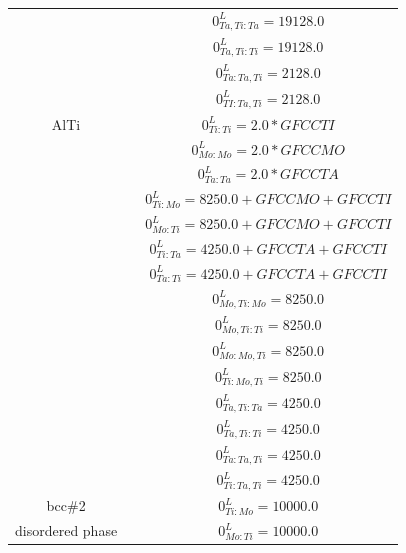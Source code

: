 \begin{longtable}[H]{ c c c }
                              & \cite{Ansara1998} & $0^\textit{L}_{Ta,Ti:Ta} = 19128.0$\\
                              & \cite{Ansara1998} & $0^\textit{L}_{Ta,Ti:Ti} = 19128.0$\\
                              & \cite{Ansara1998} & $0^\textit{L}_{Ta:Ta,Ti} = 2128.0$\\
                              & \cite{Ansara1998} & $0^\textit{L}_{TI:Ta,Ti} = 2128.0$\\
                       AlTi & \cite{Ansara1998} & $0^\textit{L}_{Ti:Ti} = 2.0*GFCCTI$\\
                              & \cite{Ansara1998} & $0^\textit{L}_{Mo:Mo} = 2.0*GFCCMO$\\
                              & \cite{Ansara1998} & $0^\textit{L}_{Ta:Ta} = 2.0*GFCCTA$\\
                              & \cite{Ansara1998} & $0^\textit{L}_{Ti:Mo} = 8250.0+GFCCMO+GFCCTI$\\
                              & \cite{Ansara1998} & $0^\textit{L}_{Mo:Ti} = 8250.0+GFCCMO+GFCCTI$\\
                              & \cite{Ansara1998} & $0^\textit{L}_{Ti:Ta} = 4250.0+GFCCTA+GFCCTI$\\
                              & \cite{Ansara1998} & $0^\textit{L}_{Ta:Ti} = 4250.0+GFCCTA+GFCCTI$\\
                              & \cite{Ansara1998} & $0^\textit{L}_{Mo,Ti:Mo} = 8250.0$\\
                              & \cite{Ansara1998} & $0^\textit{L}_{Mo,Ti:Ti} = 8250.0$\\
                        & \cite{Ansara1998} & $0^\textit{L}_{Mo:Mo,Ti} = 8250.0$\\
                        & \cite{Ansara1998} & $0^\textit{L}_{Ti:Mo,Ti} = 8250.0$\\
                        & \cite{Ansara1998} & $0^\textit{L}_{Ta,Ti:Ta} = 4250.0$\\
                        & \cite{Ansara1998} & $0^\textit{L}_{Ta,Ti:Ti} = 4250.0$\\
                        & \cite{Ansara1998} & $0^\textit{L}_{Ta:Ta,Ti} = 4250.0$\\
                        & \cite{Ansara1998} & $0^\textit{L}_{Ti:Ta,Ti} = 4250.0$\\
      bcc\#2 & \cite{Ansara1998} & $0^\textit{L}_{Ti:Mo} = 10000.0$\\
  disordered phase & \cite{Ansara1998} & $0^\textit{L}_{Mo:Ti} = 10000.0$\\

\end{longtable}

